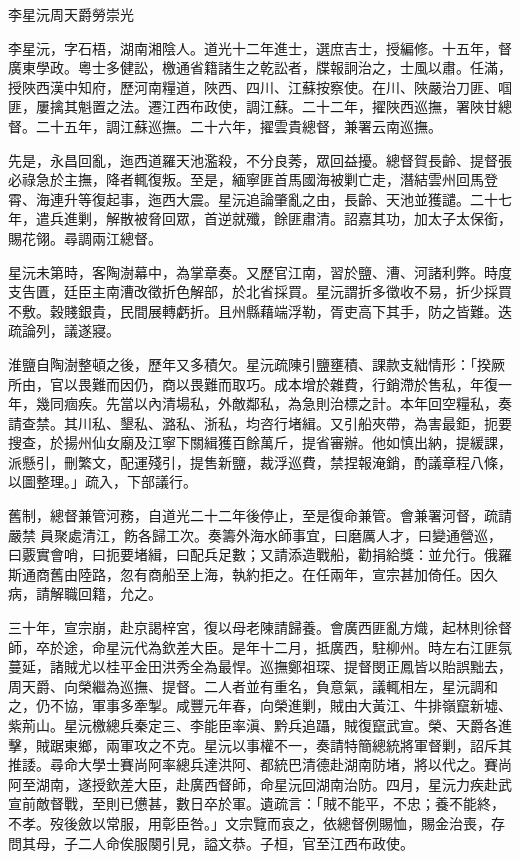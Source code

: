 
\begin{pinyinscope}
李星沅周天爵勞崇光

李星沅，字石梧，湖南湘陰人。道光十二年進士，選庶吉士，授編修。十五年，督廣東學政。粵士多健訟，檄通省籍諸生之乾訟者，牒報詗治之，士風以肅。任滿，授陜西漢中知府，歷河南糧道，陜西、四川、江蘇按察使。在川、陜嚴治刀匪、啯匪，屢擒其魁置之法。遷江西布政使，調江蘇。二十二年，擢陜西巡撫，署陜甘總督。二十五年，調江蘇巡撫。二十六年，擢雲貴總督，兼署云南巡撫。

先是，永昌回亂，迤西道羅天池濫殺，不分良莠，眾回益擾。總督賀長齡、提督張必祿急於主撫，降者輒復叛。至是，緬寧匪首馬國海被剿亡走，潛結雲州回馬登霄、海連升等復起事，迤西大震。星沅追論肇亂之由，長齡、天池並獲譴。二十七年，遣兵進剿，解散被脅回眾，首逆就殲，餘匪肅清。詔嘉其功，加太子太保銜，賜花翎。尋調兩江總督。

星沅未第時，客陶澍幕中，為掌章奏。又歷官江南，習於鹽、漕、河諸利弊。時度支告匱，廷臣主南漕改徵折色解部，於北省採買。星沅謂折多徵收不易，折少採買不敷。穀賤銀貴，民間展轉虧折。且州縣藉端浮勒，胥吏高下其手，防之皆難。迭疏論列，議遂寢。

淮鹽自陶澍整頓之後，歷年又多積欠。星沅疏陳引鹽壅積、課款支絀情形：「揆厥所由，官以畏難而因仍，商以畏難而取巧。成本增於雜費，行銷滯於售私，年復一年，幾同痼疾。先當以內清場私，外敵鄰私，為急則治標之計。本年回空糧私，奏請查禁。其川私、墾私、潞私、浙私，均咨行堵緝。又引船夾帶，為害最鉅，扼要搜查，於揚州仙女廟及江寧下關緝獲百餘萬斤，提省審辦。他如慎出納，提緩課，派懸引，刪繁文，配運殘引，提售新鹽，裁浮巡費，禁捏報淹銷，酌議章程八條，以圖整理。」疏入，下部議行。

舊制，總督兼管河務，自道光二十二年後停止，至是復命兼管。會兼署河督，疏請嚴禁員聚處清江，飭各歸工次。奏籌外海水師事宜，曰磨厲人才，曰變通營巡，曰覈實會哨，曰扼要堵緝，曰配兵足數；又請添造戰船，勸捐給獎：並允行。俄羅斯通商舊由陸路，忽有商船至上海，執約拒之。在任兩年，宣宗甚加倚任。因久病，請解職回籍，允之。

三十年，宣宗崩，赴京謁梓宮，復以母老陳請歸養。會廣西匪亂方熾，起林則徐督師，卒於途，命星沅代為欽差大臣。是年十二月，抵廣西，駐柳州。時左右江匪氛蔓延，諸賊尤以桂平金田洪秀全為最悍。巡撫鄭祖琛、提督閔正鳳皆以貽誤黜去，周天爵、向榮繼為巡撫、提督。二人者並有重名，負意氣，議輒相左，星沅調和之，仍不協，軍事多牽掣。咸豐元年春，向榮進剿，賊由大黃江、牛排嶺竄新墟、紫荊山。星沅檄總兵秦定三、李能臣率滇、黔兵追躡，賊復竄武宣。榮、天爵各進擊，賊踞東鄉，兩軍攻之不克。星沅以事權不一，奏請特簡總統將軍督剿，詔斥其推諉。尋命大學士賽尚阿率總兵達洪阿、都統巴清德赴湖南防堵，將以代之。賽尚阿至湖南，遂授欽差大臣，赴廣西督師，命星沅回湖南治防。四月，星沅力疾赴武宣前敵督戰，至則已憊甚，數日卒於軍。遺疏言：「賊不能平，不忠；養不能終，不孝。歿後斂以常服，用彰臣咎。」文宗覽而哀之，依總督例賜恤，賜金治喪，存問其母，子二人命俟服闋引見，謚文恭。子桓，官至江西布政使。


\end{pinyinscope}
